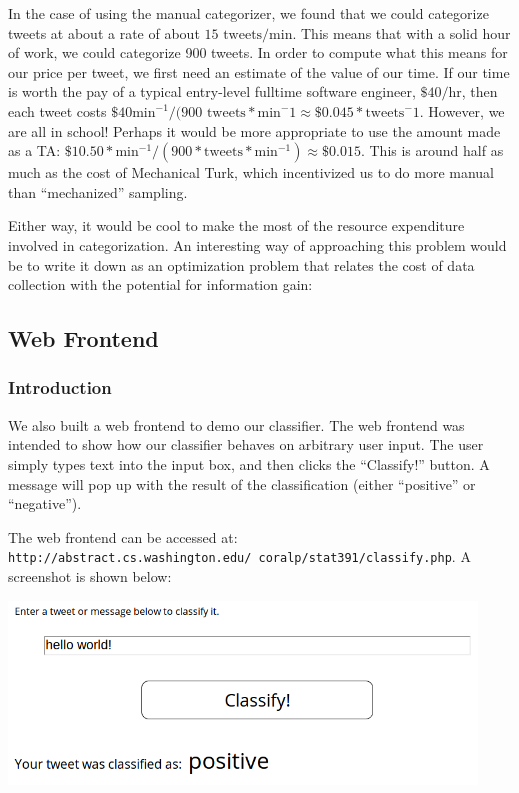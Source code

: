 \documentclass[12pt,a4paper]{article}
\begin{document}

In the case of using the manual categorizer, we found that we could categorize tweets at about a rate of about $ 15 \text{ tweets} / \text{min} $.  This means that with a solid hour of work, we could categorize 900 tweets.  In order to compute what this means for our price per tweet, we first need an estimate of the value of our time.  If our time is worth the pay of a typical entry-level fulltime software engineer, $ \$40 / \text{hr} $, then each tweet costs $ \$40 \text{min}^{-1} / ( 900 \text{ tweets} * \text{min}^-1 \approx \$0.045 * \text{tweets}^-1 $.  However, we are all in school!  Perhaps it would be more appropriate to use the amount made as a TA: $ \$10.50 * \text{min}^{-1} / ( 900 * \text{tweets} * \text{min}^{-1} ) \approx \$0.015 $.  This is around half as much as the cost of Mechanical Turk, which incentivized us to do more manual than ``mechanized'' sampling.

Either way, it would be cool to make the most of the resource expenditure involved in categorization.  An interesting way of approaching this problem would be to write it down as an optimization problem that relates the cost of data collection with the potential for information gain:

\subsection{Web Frontend}

\subsubsection{Introduction}
We also built a web frontend to demo our classifier. The web frontend was intended to show how our classifier behaves on arbitrary  user input. The user simply types text into the input box, and then clicks the ``Classify!'' button. A message will pop up with the result of the classification (either ``positive'' or ``negative'').

The web frontend can be accessed at: \texttt{http://abstract.cs.washington.edu/~coralp/stat391/classify.php}. A screenshot is shown below:

\includegraphics[width=470px]{figs/web_frontend.png}
\end{document}
